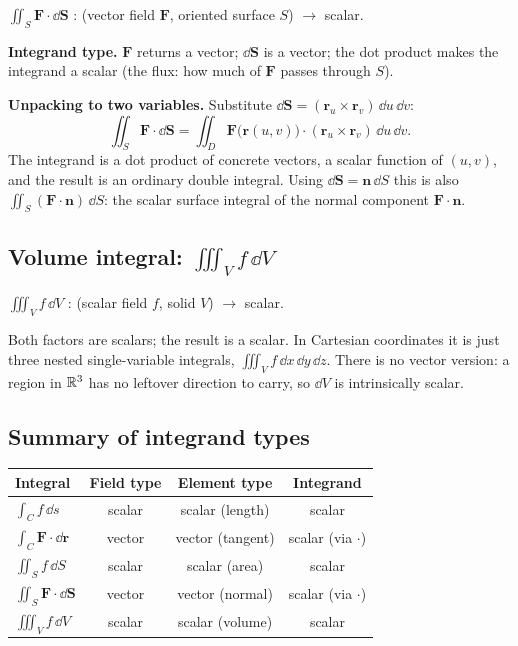 \documentclass{essay}
\newcommand{\F}{\mathbf{F}}
\newcommand{\rr}{\mathbf{r}}
\newcommand{\nn}{\mathbf{n}}
\begin{document}
\begin{signature}
  \(\displaystyle \iint_{S} \F\cdot\dd\mathbf{S}\) \;:\; (vector field \(\F\), oriented
  surface \(S\)) \(\to\) scalar.
\end{signature}

\textbf{Integrand type.} \(\F\) returns a vector; \(\dd\mathbf{S}\) is a vector; the dot
product makes the integrand a scalar (the flux: how much of \(\F\) passes through \(S\)).

\textbf{Unpacking to two variables.} Substitute
\(\dd\mathbf{S}=(\rr_{u}\times\rr_{v})\,\dd u\,\dd v\):
\[ \iint_{S} \F\cdot\dd\mathbf{S} = \iint_{D} \F\bigl(\rr(u,v)\bigr)\cdot(\rr_{u}\times\rr_{v})\,\dd u\,\dd v . \]
The integrand is a dot product of concrete vectors, a scalar function of \((u,v)\), and
the result is an ordinary double integral. Using \(\dd\mathbf{S}=\nn\,\dd S\) this is
also \(\iint_{S}(\F\cdot\nn)\,\dd S\): the scalar surface integral of the normal
component \(\F\cdot\nn\).

\subsection{Volume integral: \(\iiint_{V} f\,\dd V\)}

\begin{signature}
  \(\displaystyle \iiint_{V} f\,\dd V\) \;:\; (scalar field \(f\), solid \(V\)) \(\to\) scalar.
\end{signature}
Both factors are scalars; the result is a scalar. In Cartesian coordinates it is just
three nested single-variable integrals,
\(\iiint_{V} f\,\dd x\,\dd y\,\dd z\). There is no vector version: a region in \(\mathbb{R}^{3}\) has
no leftover direction to carry, so \(\dd V\) is intrinsically scalar.

\subsection{Summary of integrand types}

\begin{center}
  \renewcommand{\arraystretch}{1.4}
  \begin{tabular}{@{}l c c c@{}}
    \toprule
    \textbf{Integral} & \textbf{Field type} & \textbf{Element type} & \textbf{Integrand} \\
    \midrule
    \(\int_{C} f\,\dd s\)            & scalar & scalar (length) & scalar \\
    \(\int_{C} \F\cdot\dd\mathbf{r}\) & vector & vector (tangent) & scalar (via \(\cdot\)) \\
    \(\iint_{S} f\,\dd S\)           & scalar & scalar (area)   & scalar \\
    \(\iint_{S} \F\cdot\dd\mathbf{S}\) & vector & vector (normal) & scalar (via \(\cdot\)) \\
    \(\iiint_{V} f\,\dd V\)          & scalar & scalar (volume) & scalar \\
    \bottomrule
  \end{tabular}
\end{center}
\end{document}
